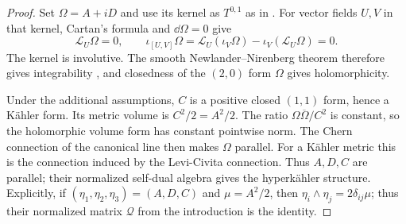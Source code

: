 \begin{proof}
Set $\Omega=A+iD$ and use its kernel as $T^{0,1}$ as in
. For vector fields $U,V$ in that kernel,
Cartan's formula and $\dd\Omega=0$ give
\[
 \mathcal L_U\Omega=0,\qquad
 \iota_{[U,V]}\Omega
 =\mathcal L_U(\iota_V\Omega)-\iota_V(\mathcal L_U\Omega)=0.
\]
The kernel is involutive. The smooth Newlander--Nirenberg theorem
therefore gives integrability \cite{NewlanderNirenberg1957}, and
closedness of the $(2,0)$ form
$\Omega$ gives holomorphicity.

Under the additional assumptions, $C$ is a positive closed $(1,1)$
form, hence a K\"ahler form. Its metric volume is $C^2/2=A^2/2$.
The ratio $\Omega\overline\Omega/C^2$ is constant, so the holomorphic
volume form has constant pointwise norm. The Chern connection of the
canonical line then makes $\Omega$ parallel. For a K\"ahler metric
this is the connection induced by the Levi-Civita connection.
Thus $A,D,C$ are parallel; their normalized self-dual algebra gives
the hyperk\"ahler structure. Explicitly, if
$(\eta_1,\eta_2,\eta_3)=(A,D,C)$ and $\mu=A^2/2$, then
$\eta_i\wedge\eta_j=2\delta_{ij}\mu$; thus their normalized
matrix $\mathcal Q$ from the introduction is the identity.
\end{proof}
